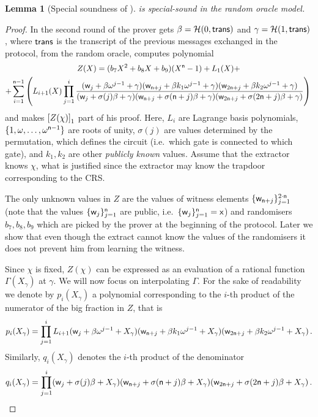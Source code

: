 \documentclass[runningheads]{llncs}
\newtheorem{lemma}[theorem]{Lemma}
\theoremstyle{definition}
\begin{document}
\begin{lemma}[Special soundness of \plonk{}]
  \plonk{} is special-sound in the random oracle model.
\end{lemma}
\begin{proof}
In the second round of \plonk{} the prover gets $\beta = \mathcal{H}(0, \mathsf{trans})$ and $\gamma = \mathcal{H}(1, \mathsf{trans})$, where $\mathsf{trans}$ is the transcript of the previous messages exchanged in the protocol, from the random oracle, computes polynomial
%
\begin{multline}
  \label{eq:Z}
  Z(X) = (b_7 X^2 + b_8 X + b_9) (X^{\mathsf{n}} - 1) + L_1 (X) + \\
   + \sum_{i = 1}^{\mathsf{n} - 1}\left(L_{i + 1}(X) \prod_{j = 1}^{i} 
  \frac{(\mathsf{w}_j + \beta \omega^{j - 1} + \gamma)(\mathsf{w}_{\mathsf{n} + j} + \beta k_1 \omega^{j - 1} + \gamma) (\mathsf{w}_{2\mathsf{n} + j} + \beta k_2 \omega^{j - 1} + \gamma)}
  {(\mathsf{w}_j + \sigma(j)\beta + \gamma)(\mathsf{w}_{\mathsf{n} + j} + \sigma(\mathsf{n} + j)\beta + \gamma)(\mathsf{w}_{2\mathsf{n} + j} + \sigma (2\mathsf{n} + j) \beta + \gamma)}
  \right)\,
\end{multline}
and makes $\left[Z(\chi)\right]_{1}$ part of his proof. 
Here, $L_i$ are Lagrange basis polynomials, $\{1, \omega, \ldots, \omega^{\mathsf{n} - 1}\}$ are roots of unity, $\sigma(j)$ are values determined by the permutation, which defines the circuit (i.e.~which gate is connected to which gate), and $k_1, k_2$ are other \emph{publicly known} values.
Assume that the extractor knows $\chi$, what is justified since the extractor may know the trapdoor corresponding to the CRS. 
 
The only unknown values in $Z$ are the values of witness elements $\{\mathsf{w}_{\mathsf{n} + j}\}_{j = 1}^{2 \cdot \mathsf{n}}$ (note that the values $\{\mathsf{w}_{j}\}_{j = 1}^{\mathsf{n}}$ are public, i.e.~$\{\mathsf{w}_{j}\}_{j = 1}^{\mathsf{n}} = \mathsf{x}$) and randomisers $b_7, b_8, b_9$ which are picked by the prover at the beginning of the protocol. Later we show that even though the extract cannot know the values of the randomisers it does not prevent him from learning the witness.

Since $\chi$ is fixed, $Z(\chi)$ can be expressed as an evaluation of a rational function $\Gamma(X_\gamma)$ at $\gamma$. We will now focus on interpolating $\Gamma$.
For the sake of readability we denote by $p_i (X_\gamma)$ a polynomial corresponding to the $i$-th product of the numerator of the big fraction in $Z$, that is
\[
  p_i(X_\gamma) = \prod_{j = 1}^{i} L_{i + 1} (\mathsf{w}_j + \beta \omega^{j - 1} + X_\gamma)(\mathsf{w}_{\mathsf{n} + j} + \beta k_1 \omega^{j - 1} + X_\gamma) (\mathsf{w}_{2\mathsf{n} + j} + \beta k_2 \omega^{j - 1} + X_\gamma)\,.
\]
Similarly, $q_i (X_\gamma)$ denotes the $i$-th product of the denominator
\[
  q_i(X_\gamma) = \prod_{j = 1}^{i} (\mathsf{w}_j + \sigma(j)\beta + X_\gamma)(\mathsf{w}_{\mathsf{n} + j} + \sigma(\mathsf{n} + j)\beta + X_\gamma)(\mathsf{w}_{2\mathsf{n} + j} + \sigma (2\mathsf{n} + j) \beta + X_\gamma)\,.
\]


\end{proof}
\end{document}
